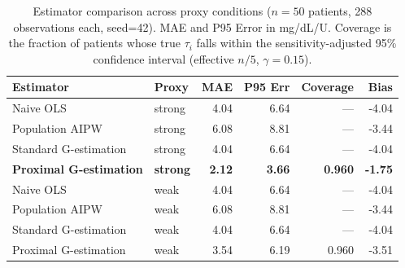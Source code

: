 \begin{table}[htbp]
\centering
\caption{Estimator comparison across proxy conditions ($n=50$ patients, 288 observations each, seed=42). MAE and P95 Error in mg/dL/U. Coverage is the fraction of patients whose true $\tau_i$ falls within the sensitivity-adjusted 95\% confidence interval (effective $n/5$, $\gamma=0.15$).}
\label{tab:main_results}
\begin{tabular}{llrrrr}
\toprule
Estimator & Proxy & MAE & P95 Err & Coverage & Bias \\
\midrule
Naive OLS & strong & 4.04 & 6.64 & --- & -4.04 \\
Population AIPW & strong & 6.08 & 8.81 & --- & -3.44 \\
Standard G-estimation & strong & 4.04 & 6.64 & --- & -4.04 \\
\textbf{Proximal G-estimation} & \textbf{strong} & \textbf{2.12} & \textbf{3.66} & \textbf{0.960} & \textbf{-1.75} \\
\midrule
Naive OLS & weak & 4.04 & 6.64 & --- & -4.04 \\
Population AIPW & weak & 6.08 & 8.81 & --- & -3.44 \\
Standard G-estimation & weak & 4.04 & 6.64 & --- & -4.04 \\
Proximal G-estimation & weak & 3.54 & 6.19 & 0.960 & -3.51 \\
\bottomrule
\end{tabular}
\end{table}
